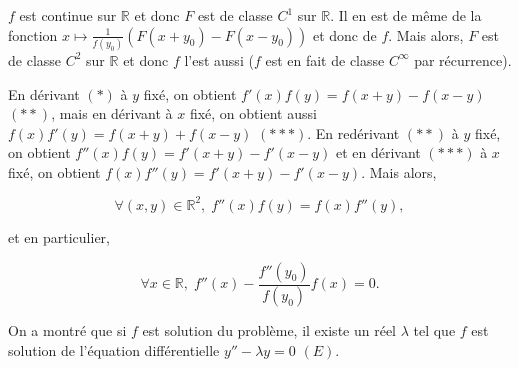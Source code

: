 \documentclass[11pt,a4paper]{article}
\newcommand{\Rr}{\mathbb{R}} \newcommand{\R}{\mathbb{R}}
\begin{document}
$f$ est continue sur $\Rr$ et donc $F$ est de classe $C^1$ sur $\Rr$. Il en est de même de la fonction $x\mapsto\frac{1}{f(y_0)}(F(x+y_0)-F(x-y_0))$ et donc de $f$. Mais alors, $F$ est de classe $C^2$ sur $\Rr$ et donc $f$ l'est aussi ($f$ est en fait de classe $C^\infty$ par récurrence).

En dérivant $(*)$ à $y$ fixé, on obtient $f'(x)f(y)=f(x+y)-f(x-y)$ $(**)$, mais en dérivant à $x$ fixé, on obtient aussi $f(x)f'(y)=f(x+y)+f(x-y)$ $(***)$. En redérivant $(**)$ à $y$ fixé, on obtient $f''(x)f(y)=f'(x+y)-f'(x-y)$ et en dérivant $(***)$ à $x$ fixé, on obtient $f(x)f''(y)=f'(x+y)-f'(x-y)$. Mais alors,

$$\forall(x,y)\in\Rr^2,\;f''(x)f(y)=f(x)f''(y),$$

et en particulier,

$$\forall x\in\Rr,\;f''(x)-\frac{f''(y_0)}{f(y_0)}f(x)=0.$$

On a montré que si $f$ est solution du problème, il existe un réel $\lambda$ tel que $f$ est solution de l'équation différentielle $y''-\lambda y=0$ $(E)$.
\end{document}
